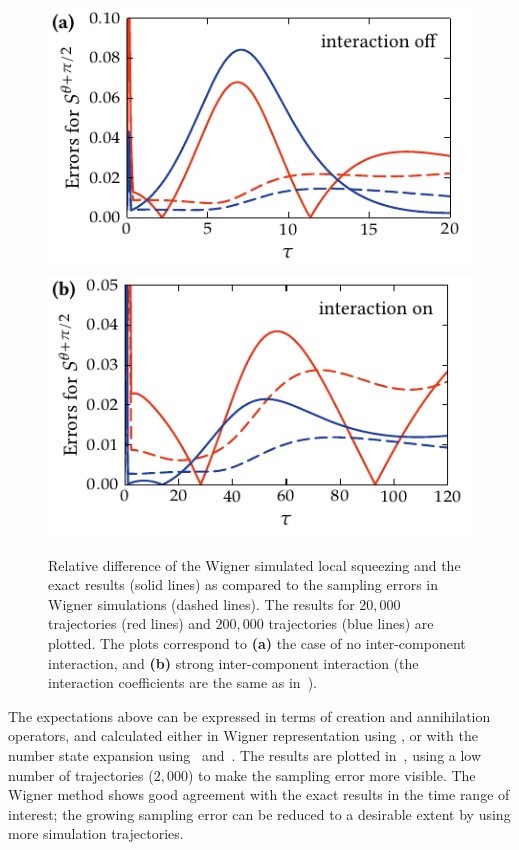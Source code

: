 \begin{figure}
    \centerline{%
    \includegraphics{figures_generated/exact/squeezing_nocc_err.pdf}%
    \includegraphics{figures_generated/exact/squeezing_cc_err.pdf}}

    \caption[Sampling and systematic errors in Wigner simulated local squeezing]{
    Relative difference of the Wigner simulated local squeezing and the exact results (solid lines) as compared to the sampling errors in Wigner simulations (dashed lines).
    The results for $20,000$ trajectories (red lines) and $200,000$ trajectories (blue lines) are plotted.
    The plots correspond to \textbf{(a)} the case of no inter-component interaction, and \textbf{(b)} strong inter-component interaction (the interaction coefficients are the same as in~).}%

    \label{fig:exact:squeezing-error-comparison}
\end{figure}

The expectations above can be expressed in terms of creation and annihilation operators, and calculated either in Wigner representation using , or with the number state expansion using~ and~.
The results are plotted in~, using a low number of trajectories ($2,000$) to make the sampling error more visible.
The Wigner method shows good agreement with the exact results in the time range of interest; the growing sampling error can be reduced to a desirable extent by using more simulation trajectories.

